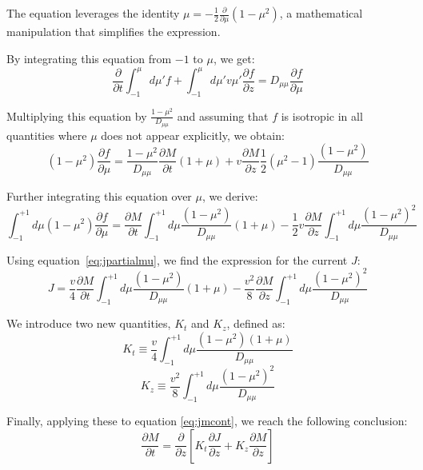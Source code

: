 The equation leverages the identity \(\mu = -\frac{1}{2}\frac{\partial}{\partial \mu}(1-\mu^2)\), a mathematical manipulation that simplifies the expression.

By integrating this equation from \( -1 \) to \( \mu \), we get:
%
\begin{equation}
\frac{\partial}{\partial t}\int_{-1}^{\mu} d\mu' f +\int_{-1}^{\mu} d\mu' v\mu' \frac{\partial f}{\partial z}=D_{\mu\mu}\frac{\partial f}{\partial \mu}
\end{equation}

Multiplying this equation by \( \frac{1-\mu^2}{D_{\mu\mu}} \) and assuming that \( f \) is isotropic in all quantities where \( \mu \) does not appear explicitly, we obtain:
%
\begin{equation}
(1-\mu^2)\frac{\partial f}{\partial \mu}=\frac{1-\mu^2}{D_{\mu\mu}} \frac{\partial M}{\partial t}(1+\mu) + v\frac{\partial M}{\partial z}\frac{1}{2} (\mu^2-1)\frac{(1-\mu^2)}{D_{\mu\mu}}
\end{equation}

Further integrating this equation over \( \mu \), we derive:
%
\begin{equation}
\int_{-1}^{+1} d\mu (1-\mu^2)\frac{\partial f}{\partial \mu} =\frac{\partial M}{\partial t}\int_{-1}^{+1} d\mu \frac{(1-\mu^2)}{D_{\mu\mu}}(1+\mu) -\frac{1}{2}v\frac{\partial M}{\partial z}\int_{-1}^{+1} d\mu \frac{(1-\mu^2)^2}{D_{\mu\mu}}
\end{equation}

Using equation~\eqref{eq:jpartialmu}, we find the expression for the current \( J \):
%
\begin{equation}
J = \frac{v}{4}\frac{\partial M}{\partial t}\int_{-1}^{+1} d\mu \frac{(1-\mu^2)}{D_{\mu\mu}}(1+\mu) -\frac{v^2}{8}\frac{\partial M}{\partial z}\int_{-1}^{+1} d\mu \frac{(1-\mu^2)^2}{D_{\mu\mu}}
\end{equation}

We introduce two new quantities, \( K_t \) and \( K_z \), defined as:
%
\begin{equation}
K_t \equiv \frac{v}{4} \int_{-1}^{+1}d\mu \frac{(1-\mu^2)(1+\mu)}{D_{\mu\mu}} 
\end{equation}
\begin{equation}\label{eq:kzz}
K_z \equiv \frac{v^2}{8}\int_{-1}^{+1} d\mu \frac{(1-\mu^2)^2}{D_{\mu\mu}}
\end{equation}

Finally, applying these to equation \eqref{eq:jmcont}, we reach the following conclusion:
%
\begin{equation}
\frac{\partial M}{\partial t} = \frac{\partial }{\partial z}\left[ K_t\frac{\partial J}{\partial z} + K_z\frac{\partial M}{\partial z}  \right]
\end{equation}

